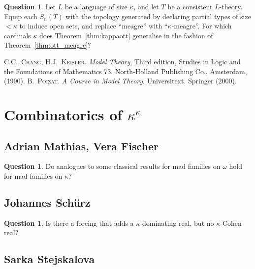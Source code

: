 \documentclass{amsart}
\theoremstyle{definition}
\newtheorem{question}[theorem]{Question}
\begin{document}
\begin{question}
Let $L$ be a language of size $\kappa$, and let $T$ be a consistent $L$-theory.  Equip each $S_n(T)$ with the topology  generated by declaring partial types of size $<\kappa$ to induce open sets, and  replace ``meagre'' with ``$\kappa$-meagre''. For which cardinals $\kappa$ does Theorem~\ref{thm:kappaott} generalise in the fashion of Theorem~\ref{thm:ott_meagre}?
\end{question}

\begin{thebibliography}{0}
C.C.~\textsc{Chang}, H.J.~\textsc{Keisler}.
\newblock \emph{Model Theory},
\newblock Third edition, Studies in Logic and the Foundations of Mathematics 73. North-Holland Publishing Co., Amsterdam, (1990). 
B.~\textsc{Poizat}.
\newblock \emph{A Course in Model Theory}.
\newblock Universitext. Springer (2000).
\end{thebibliography}




\newpage 

\section{Combinatorics of $\kappa^\kappa$} 

\subsection{Adrian Mathias, Vera Fischer} 

\begin{question} 
Do analogues to some classical results for mad families on $\omega$ hold for mad families on $\kappa$? 
\end{question} 


\subsection{Johannes Sch\"urz} 

\begin{question} 
Is there a forcing that adds a $\kappa$-dominating real, but no $\kappa$-Cohen real? 
\end{question} 


\subsection{Sarka Stejskalova} 
\end{document}
